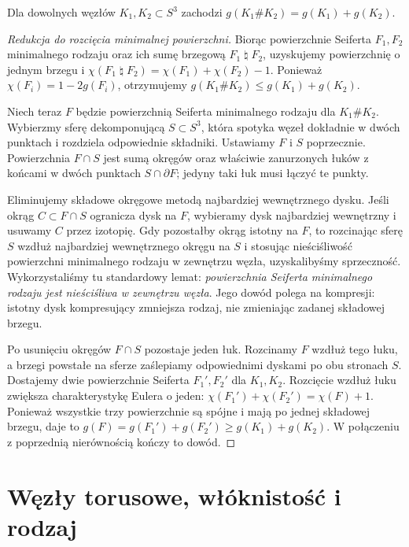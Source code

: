 \begin{twierdzenie}
Dla dowolnych węzłów $K_1,K_2\subset S^3$ zachodzi
$g(K_1\#K_2)=g(K_1)+g(K_2)$.
\end{twierdzenie}

\begin{proof}[Redukcja do rozcięcia minimalnej powierzchni]
Biorąc powierzchnie Seiferta $F_1,F_2$ minimalnego rodzaju
oraz ich sumę brzegową $F_1\mathbin{\natural}F_2$,
uzyskujemy powierzchnię o jednym brzegu i
$\chi(F_1\mathbin{\natural}F_2)=\chi(F_1)+\chi(F_2)-1$.
Ponieważ $\chi(F_i)=1-2g(F_i)$, otrzymujemy
$g(K_1\#K_2)\le g(K_1)+g(K_2)$.

Niech teraz $F$ będzie powierzchnią Seiferta minimalnego rodzaju
dla $K_1\#K_2$. Wybierzmy sferę dekomponującą
$S\subset S^3$, która spotyka węzeł dokładnie w dwóch
punktach i rozdziela odpowiednie składniki. Ustawiamy $F$
i $S$ poprzecznie. Powierzchnia $F\cap S$ jest sumą
okręgów oraz właściwie zanurzonych łuków z końcami w dwóch
punktach $S\cap\partial F$; jedyny taki łuk musi łączyć
te punkty.

Eliminujemy składowe okręgowe metodą najbardziej wewnętrznego
dysku. Jeśli okrąg $C\subset F\cap S$ ogranicza dysk na
$F$, wybieramy dysk najbardziej wewnętrzny i usuwamy
$C$ przez izotopię. Gdy pozostałby okrąg istotny na $F$,
to rozcinając sferę $S$ wzdłuż najbardziej wewnętrznego
okręgu na $S$ i stosując nieściśliwość powierzchni
minimalnego rodzaju w zewnętrzu węzła, uzyskalibyśmy
sprzeczność. Wykorzystaliśmy tu standardowy lemat:
\emph{powierzchnia Seiferta minimalnego rodzaju jest
nieściśliwa w zewnętrzu węzła}. Jego dowód polega na
kompresji: istotny dysk kompresujący zmniejsza rodzaj,
nie zmieniając zadanej składowej brzegu.

Po usunięciu okręgów $F\cap S$ pozostaje jeden łuk.
Rozcinamy $F$ wzdłuż tego łuku, a brzegi powstałe na
sferze zaślepiamy odpowiednimi dyskami po obu stronach
$S$. Dostajemy dwie powierzchnie Seiferta $F_1',F_2'$
dla $K_1,K_2$. Rozcięcie wzdłuż łuku zwiększa
charakterystykę Eulera o jeden:
$\chi(F_1')+\chi(F_2')=\chi(F)+1$.
Ponieważ wszystkie trzy powierzchnie są spójne i mają
po jednej składowej brzegu, daje to
$g(F)=g(F_1')+g(F_2')\ge g(K_1)+g(K_2)$.
W połączeniu z poprzednią nierównością kończy to dowód.
\end{proof}

\section{Węzły torusowe, włóknistość i rodzaj}
\label{sec:kt-torusowe}

